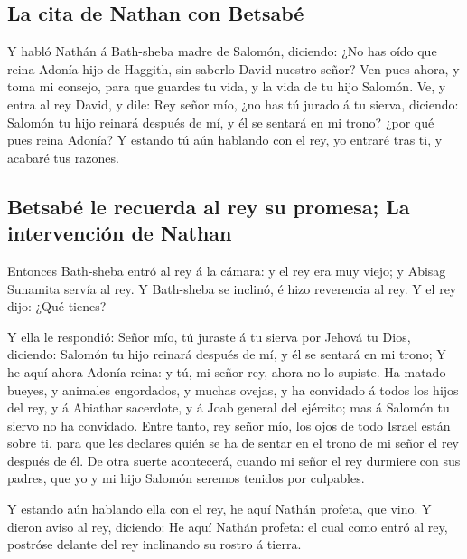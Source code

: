 \hypertarget{la-cita-de-nathan-con-betsabuxe9}{%
\subsection{La cita de Nathan con
Betsabé}\label{la-cita-de-nathan-con-betsabuxe9}}

 Y habló Nathán á Bath-sheba madre de Salomón, diciendo:
¿No has oído que reina Adonía hijo de Haggith, sin saberlo David nuestro
señor?  Ven pues ahora, y toma mi consejo, para que guardes
tu vida, y la vida de tu hijo Salomón.  Ve, y entra al rey
David, y dile: Rey señor mío, ¿no has tú jurado á tu sierva, diciendo:
Salomón tu hijo reinará después de mí, y él se sentará en mi trono? ¿por
qué pues reina Adonía?  Y estando tú aún hablando con el
rey, yo entraré tras ti, y acabaré tus razones.

\hypertarget{betsabuxe9-le-recuerda-al-rey-su-promesa-la-intervenciuxf3n-de-nathan}{%
\subsection{Betsabé le recuerda al rey su promesa; La intervención de
Nathan}\label{betsabuxe9-le-recuerda-al-rey-su-promesa-la-intervenciuxf3n-de-nathan}}

 Entonces Bath-sheba entró al rey á la cámara: y el rey era
muy viejo; y Abisag Sunamita servía al rey.  Y Bath-sheba
se inclinó, é hizo reverencia al rey. Y el rey dijo: ¿Qué tienes?

 Y ella le respondió: Señor mío, tú juraste á tu sierva por
Jehová tu Dios, diciendo: Salomón tu hijo reinará después de mí, y él se
sentará en mi trono;  Y he aquí ahora Adonía reina: y tú,
mi señor rey, ahora no lo supiste.  Ha matado bueyes, y
animales engordados, y muchas ovejas, y ha convidado á todos los hijos
del rey, y á Abiathar sacerdote, y á Joab general del ejército; mas á
Salomón tu siervo no ha convidado.  Entre tanto, rey señor
mío, los ojos de todo Israel están sobre ti, para que les declares quién
se ha de sentar en el trono de mi señor el rey después de él.
 De otra suerte acontecerá, cuando mi señor el rey durmiere
con sus padres, que yo y mi hijo Salomón seremos tenidos por culpables.

 Y estando aún hablando ella con el rey, he aquí Nathán
profeta, que vino.  Y dieron aviso al rey, diciendo: He
aquí Nathán profeta: el cual como entró al rey, postróse delante del rey
inclinando su rostro á tierra.

